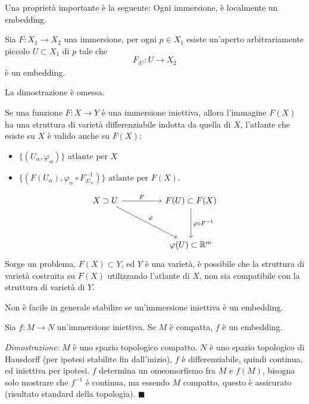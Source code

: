 \documentclass[10pt, letterpaper]{report}
\begin{document}
 Una proprietà importante è la seguente: Ogni immersione, è localmente un embedding.\begin{teorema}
    Sia $F:X_1\rightarrow X_2$ una immersione, per ogni $p\in X_1$ esiste un'aperto arbitrariamente piccolo $U\subset X_1$ di $p$ tale che \begin{equation}
        F_{|U}:U\rightarrow X_2
    \end{equation}
    è un embedding.
 \end{teorema}
La dimostrazione è omessa.
\begin{osservazione}
    Se una funzione $F:X\rightarrow Y$ è una immersione iniettiva, allora l'immagine $F(X)$ ha una struttura di varietà differenziabile indotta da quella di $X$, l'atlante che esiste su $X$ è valido anche su $F(X)$:\begin{itemize}
        \item$\{(U_\alpha,\varphi_\alpha)\}\text{ atlante per }X$
         \item$\{(F(U_\alpha),\varphi_\alpha\circ F^{-1}_{|U_\alpha})\}\text{ atlante per }F(X)$.
    \end{itemize}
\end{osservazione}
\[
\begin{tikzcd}[column sep=huge, row sep=huge]
X\supset U \arrow[r,"F"] \arrow[dr, "\varphi"] & F(U)\subset F(X) \arrow[d, "\varphi \circ F^{-1}"] \\
& \varphi(U) \subset \mathbb{R}^m
\end{tikzcd}
\] 
Sorge un problema, $F(X)\subset Y$, ed $Y$ è una varietà, è possibile che la struttura di varietà costruita su $F(X)$ utilizzando l'atlante di $X$, non sia compatibile con la struttura di varietà di $Y$.
\begin{osservazione}
    Non è facile in generale stabilire se un'immersione iniettiva è un embedding.
\end{osservazione}
\begin{teorema}
    Sia $f:M\rightarrow N$ un'immersione iniettiva. Se $M$ è compatta, $f$ è un embedding.
\end{teorema}
\textit{Dimostrazione}: $M$ è uno spazio topologico compatto. $N$ è uno spazio topologico di Hausdorff (per ipotesi stabilite fin dall'inizio), $f$ è differenziabile, quindi continua, ed iniettiva per ipotesi. $f$ determina un omeomorfismo fra $M$ e $f(M)$, bisogna solo mostrare che $f^{-1}$ è continua, ma essendo $M$ compatto, questo è assicurato (risultato standard della topologia). \hfill$\blacksquare$\bigskip
\end{document}
